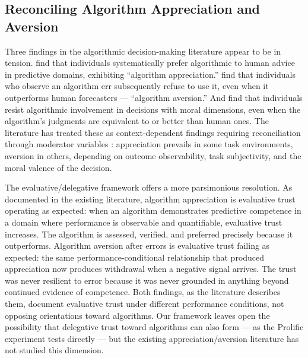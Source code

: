\subsection{Reconciling Algorithm Appreciation and Aversion}
\label{subsec:reconciling}

Three findings in the algorithmic decision-making literature appear to be in tension. \citet{LoggMinsonMoore2019} find that individuals systematically prefer algorithmic to human advice in predictive domains, exhibiting ``algorithm appreciation.'' \citet{DietvorstSimmonsMassey2015} find that individuals who observe an algorithm err subsequently refuse to use it, even when it outperforms human forecasters --- ``algorithm aversion.'' And \citet{BigmanGray2018} find that individuals resist algorithmic involvement in decisions with moral dimensions, even when the algorithm's judgments are equivalent to or better than human ones. The literature has treated these as context-dependent findings requiring reconciliation through moderator variables \citep[e.g.,][]{CasteloBosLehmann2019, JussupowBenbasatHeinzl2024}: appreciation prevails in some task environments, aversion in others, depending on outcome observability, task subjectivity, and the moral valence of the decision.

The evaluative/delegative framework offers a more parsimonious resolution. As documented in the existing literature, algorithm appreciation is evaluative trust operating as expected: when an algorithm demonstrates predictive competence in a domain where performance is observable and quantifiable, evaluative trust increases. The algorithm is assessed, verified, and preferred precisely because it outperforms. Algorithm aversion after errors is evaluative trust failing as expected: the same performance-conditional relationship that produced appreciation now produces withdrawal when a negative signal arrives. The trust was never resilient to error because it was never grounded in anything beyond continued evidence of competence. Both findings, as the literature describes them, document evaluative trust under different performance conditions, not opposing orientations toward algorithms. Our framework leaves open the possibility that delegative trust toward algorithms can also form --- as the Prolific experiment tests directly --- but the existing appreciation/aversion literature has not studied this dimension.

